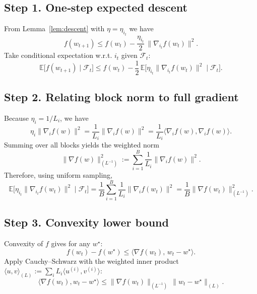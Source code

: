 \documentclass[11pt]{article}
\begin{document}
\subsection*{Step 1. One‑step expected descent}
From Lemma~\ref{lem:descent} with $\eta=\eta_{i_t}$ we have
\[
f(w_{t+1})
\le f(w_t)-\frac{\eta_{i_t}}{2}\,\|\nabla_{i_t}f(w_t)\|^{2}.
\tag{10}
\]
Take conditional expectation w.r.t. $i_t$ given $\mathcal{F}_t$:
\[
\mathbb{E}\!\bigl[f(w_{t+1})\mid\mathcal{F}_t\bigr]
\le f(w_t)-\frac12\,
\mathbb{E}\!\bigl[\eta_{i_t}\|\nabla_{i_t}f(w_t)\|^{2}\mid\mathcal{F}_t\bigr].
\tag{11}
\]

\subsection*{Step 2. Relating block norm to full gradient}
Because $\eta_{i}=1/L_i$, we have
\[
\eta_i\|\nabla_i f(w)\|^{2}
= \frac{1}{L_i}\|\nabla_i f(w)\|^{2}
= \frac{1}{L_i}\langle\nabla_i f(w),\nabla_i f(w)\rangle.
\tag{12}
\]
Summing over all blocks yields the weighted norm
\[
\| \nabla f(w) \|_{(L^{-1})}^{2}
:=\sum_{i=1}^{B}\frac{1}{L_i}\|\nabla_i f(w)\|^{2}.
\tag{13}
\]
Therefore, using uniform sampling,
\[
\mathbb{E}\!\bigl[\eta_{i_t}\|\nabla_{i_t}f(w_t)\|^{2}\mid\mathcal{F}_t\bigr]
= \frac1B\sum_{i=1}^{B}\frac{1}{L_i}\|\nabla_i f(w_t)\|^{2}
= \frac1B\|\nabla f(w_t)\|_{(L^{-1})}^{2}.
\tag{14}
\]

\subsection*{Step 3. Convexity lower bound}
Convexity of $f$ gives for any $w^\star$:
\[
f(w_t)-f(w^\star)\le\langle \nabla f(w_t),\,w_t-w^\star\rangle .
\tag{15}
\]
Apply Cauchy–Schwarz with the weighted inner product
$\langle u,v\rangle_{(L)}:=\sum_{i}L_i\langle u^{(i)},v^{(i)}\rangle$:
\[
\langle \nabla f(w_t),w_t-w^\star\rangle
\le \|\nabla f(w_t)\|_{(L^{-1})}\,\|w_t-w^\star\|_{(L)} .
\tag{16}
\]
\end{document}
